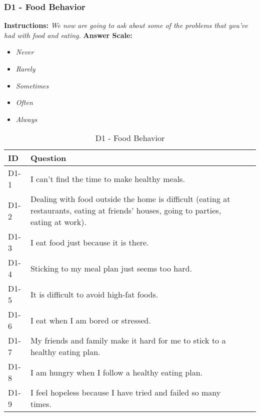 \subsubsection{D1 - Food Behavior}
\textbf{Instructions:} \emph{We now are going to ask about some of the problems that you've had with food and eating.}
\textbf{Answer Scale:}
\begin{itemize}
    \item \emph{Never}
    \item \emph{Rarely}
    \item \emph{Sometimes}
    \item \emph{Often}
    \item \emph{Always}
\end{itemize}
\begin{table}[H]
    \centering
    \renewcommand{\arraystretch}{1.2}
    \begin{tabularx}{\textwidth}{|l|X|l|}
        \hline
        \textbf{ID} & \textbf{Question} \\ \hline
        D1-1 & I can't find the time to make healthy meals. \\ \hline
        D1-2 & Dealing with food outside the home is difficult (eating at restaurants, eating at friends' houses, going to parties, eating at work). \\ \hline
        D1-3 & I eat food just because it is there. \\ \hline
        D1-4 & Sticking to my meal plan just seems too hard. \\ \hline
        D1-5 & It is difficult to avoid high-fat foods. \\ \hline
        D1-6 & I eat when I am bored or stressed. \\ \hline
        D1-7 & My friends and family make it hard for me to stick to a healthy eating plan. \\ \hline
        D1-8 & I am hungry when I follow a healthy eating plan. \\ \hline
        D1-9 & I feel hopeless because I have tried and failed so many times. \\ \hline
    \end{tabularx}
    \caption{D1 - Food Behavior}
    \label{tab:food-behavior}
\end{table}


